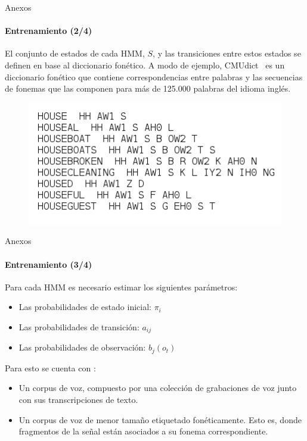 \begin{frame}[noframenumbering]{Anexos}
\framesubtitle{Entrenamiento (2/4)}

El conjunto de estados de cada HMM, $S$, y las transiciones entre estos estados se definen en base
al diccionario fon\'etico. A modo de ejemplo, \mbox{CMUdict \cite{CMUdict}} es un diccionario fon\'etico
que contiene correspondencias entre palabras y las secuencias de fonemas que las componen para m\'as de
125.000 palabras del idioma ingl\'es.

\begin{figure}[H]
\centering
\includegraphics[width=0.8\linewidth]{./graphics/diccionario.png}
\end{figure}
\end{frame}

\begin{frame}[noframenumbering]{Anexos}
\framesubtitle{Entrenamiento (3/4)}
Para cada HMM es necesario estimar los siguientes par\'ametros:
    \begin{itemize}
        \item Las probabilidades de estado inicial: $\pi_i$
        \item Las probabilidades de transici\'on: $a_{ij}$
        \item Las probabilidades de observaci\'on: $b_j(o_t)$ 
    \end{itemize}

Para esto se cuenta con \cite{Jurafsky}:
    \begin{itemize}
        \item  Un corpus de voz, compuesto por una colecci\'on de grabaciones de voz junto
        con sus transcripciones de texto.
        \item Un corpus de voz de menor tama\~no etiquetado fon\'eticamente. 
        Esto es, donde fragmentos de la se\~nal est\'an asociados a su fonema correspondiente.
    \end{itemize}

\end{frame}

